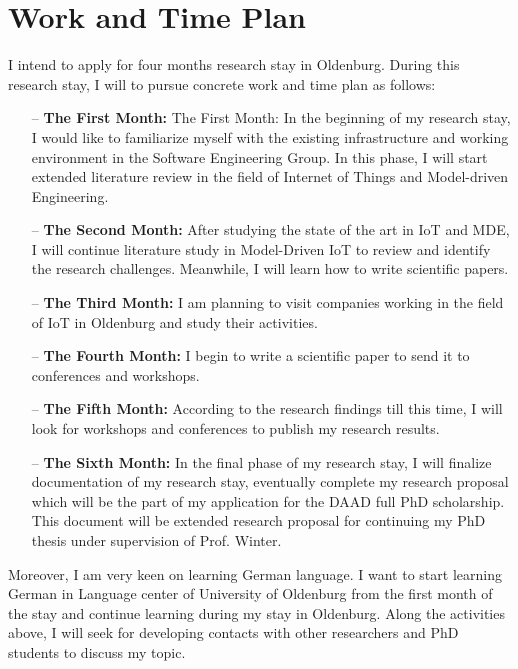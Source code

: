 \documentclass[10pt, oneside]{article}
\begin{document}
\section{Work and Time Plan}
I intend to apply for four months research stay in Oldenburg. During this research stay, I will to pursue concrete work and time plan as follows:
\begin{itemize}
\item[--] \textbf{The First Month:} The First Month: In the beginning of my research stay, I would like to familiarize myself with the existing infrastructure and working environment in the Software Engineering Group. In this phase, I will start extended literature review in the field of Internet of Things and Model-driven Engineering. 
\item[--] \textbf{The Second Month:} After studying the state of the art in IoT and MDE, I will continue literature study in Model-Driven IoT to review and identify the research challenges. Meanwhile, I will learn how to write scientific papers.
\item[--] \textbf{The Third Month:} I am planning to visit companies working in the field of IoT in Oldenburg and study their activities. 
\item[--] \textbf{The Fourth Month:} I begin to write a scientific paper to send it to conferences and workshops.
\item[--] \textbf{The Fifth Month:} According to the research findings till this time, I will look for workshops and conferences to publish my research results.
\item[--] \textbf{The Sixth Month:} In the final phase of my research stay, I will finalize documentation of my research stay, eventually complete my research proposal which will be the part of my application for the DAAD full PhD scholarship. This document will be extended research proposal for continuing my PhD thesis under supervision of Prof. Winter.
\end{itemize}
Moreover, I am very keen on learning German language. I want to start learning German in Language center of University of Oldenburg from the first month of the stay and continue learning during my stay in Oldenburg. Along the activities above, I will seek for developing contacts with other researchers and PhD students to discuss my topic.
\end{document}

